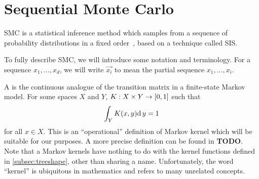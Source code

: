 %
%
%




\section{Sequential Monte Carlo}
\label{sec:smc}

\Gls{SMC} is a statistical inference method which samples from a sequence of
probability distributions in a fixed order~\autocite{del2006sequential}, based
on a technique called \gls{SIS}.

To fully describe \gls{SMC}, we will introduce some notation and terminology.
For a sequence $x_1, \ldots, x_d$, we will write $\vec{x_i}$ to mean the
partial sequence $x_1, \ldots, x_i$.

A  is the continuous analogue of the transition matrix in a
finite-state Markov model. For some spaces $X$ and $Y$, $K : X \times Y \to
[0, 1]$ such that
\begin{align}
    \label{eq:mk}
    \int_Y K(x, y) \mathrm{d}\, y = 1
\end{align}
for all $x \in X$. This is an ``operational'' definition of Markov kernel which
will be suitable for our purposes. A more precise definition can be found in
\textbf{TODO}. Note that a Markov kernels have nothing to do with the kernel
functions defined in \cref{subsec:treeshape}, other than sharing a name.
Unfortunately, the word ``kernel'' is ubiquitous in mathematics and refers to
many unrelated concepts.

